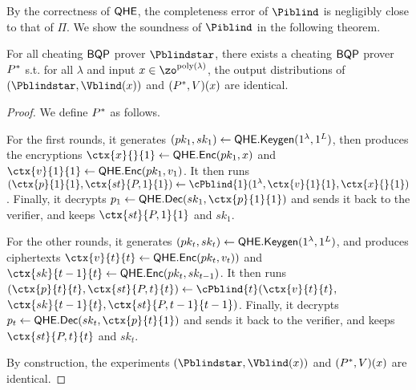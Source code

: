 By the correctness of $\mathsf{QHE}$, the completeness error of $\Piblind$ is negligibly close to that of $\Pi$.
We show the soundness of $\Piblind$ in the following theorem.

\begin{theorem}
	For all cheating $\operatorname{\mathsf{BQP}}$ prover $\Pblindstar$, there exists a cheating $\operatorname{\mathsf{BQP}}$ prover $P^*$ s.t. for all $\lambda$ and input $x\in\zo^{\poly(\lambda)}$, the output distributions of $(\Pblindstar, \Vblind(x))$ and $(P^*, V)(x)$ are identical.
\end{theorem}
\begin{proof}
	We define $P^*$ as follows.
	
	For the first rounds, it generates
	$(pk_1, sk_1)\leftarrow\mathsf{QHE.Keygen}(1^\lambda, 1^L)$, then produces the encryptions
	$\ctx{x}{}{1}\leftarrow\QEnc(pk_1, x)$ and $\ctx{v}{1}{1}\leftarrow\QEnc(pk_1, v_1)$.
	It then runs $(\ctx{p}{1}{1}, \ctx{st}{P, 1}{1})\leftarrow\cPblind{1}(1^\lambda, \ctx{v}{1}{1}, \ctx{x}{}{1})$.
	Finally, it decrypts $p_1\leftarrow\QDec(sk_1, \ctx{p}{1}{1})$ and sends it back to the verifier,
	and keeps $\ctx{st}{P, 1}{1}$ and $sk_1$.

	For the other rounds, it generates
	$(pk_t, sk_t)\leftarrow\mathsf{QHE.Keygen}(1^\lambda, 1^L)$, and produces ciphertexts
	$\ctx{v}{t}{t}\leftarrow\QEnc(pk_t, v_t))$ and $\ctx{sk}{t-1}{t}\leftarrow\QEnc(pk_t, sk_{t-1})$.
	It then runs $(\ctx{p}{t}{t}, \ctx{st}{P, t}{t})\leftarrow\cPblind{t}(\ctx{v}{t}{t},$ \ $\ctx{sk}{t-1}{t}, \ctx{st}{P, t-1}{t-1})$.
	Finally, it decrypts $p_t\leftarrow\QDec(sk_t, \ctx{p}{t}{1})$ and sends it back to the verifier,
	and keeps $\ctx{st}{P, t}{t}$ and $sk_t$.
		
	By construction, the experiments $(\Pblindstar, \Vblind(x))$ and $(P^*, V)(x)$ are identical.
\end{proof}

